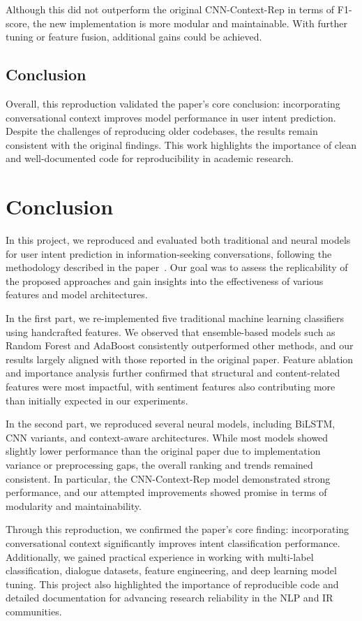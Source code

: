 \documentclass{article}
\begin{document}
Although this did not outperform the original CNN-Context-Rep in terms of F1-score, the new implementation is more modular and maintainable. With further tuning or feature fusion, additional gains could be achieved.

\subsection{Conclusion}

Overall, this reproduction validated the paper’s core conclusion: incorporating conversational context improves model performance in user intent prediction. Despite the challenges of reproducing older codebases, the results remain consistent with the original findings. This work highlights the importance of clean and well-documented code for reproducibility in academic research.

\section{Conclusion}

In this project, we reproduced and evaluated both traditional and neural models for user intent prediction in information-seeking conversations, following the methodology described in the paper~\cite{qu2019user}. Our goal was to assess the replicability of the proposed approaches and gain insights into the effectiveness of various features and model architectures.

In the first part, we re-implemented five traditional machine learning classifiers using handcrafted features. We observed that ensemble-based models such as Random Forest and AdaBoost consistently outperformed other methods, and our results largely aligned with those reported in the original paper. Feature ablation and importance analysis further confirmed that structural and content-related features were most impactful, with sentiment features also contributing more than initially expected in our experiments.

In the second part, we reproduced several neural models, including BiLSTM, CNN variants, and context-aware architectures. While most models showed slightly lower performance than the original paper due to implementation variance or preprocessing gaps, the overall ranking and trends remained consistent. In particular, the CNN-Context-Rep model demonstrated strong performance, and our attempted improvements showed promise in terms of modularity and maintainability.

Through this reproduction, we confirmed the paper’s core finding: incorporating conversational context significantly improves intent classification performance. Additionally, we gained practical experience in working with multi-label classification, dialogue datasets, feature engineering, and deep learning model tuning. This project also highlighted the importance of reproducible code and detailed documentation for advancing research reliability in the NLP and IR communities.




\end{document}
